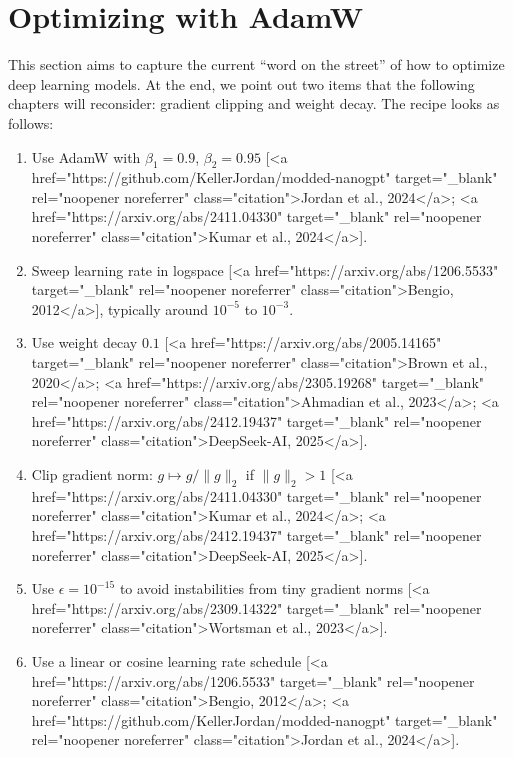\section{Optimizing with AdamW}

This section aims to capture the current “word on the street” of how to optimize deep learning models. At the end, we point out two items that the following chapters will reconsider: gradient clipping and weight decay. The recipe looks as follows:

\begin{enumerate}
    \item Use AdamW with $\beta_1 = 0.9$, $\beta_2 = 0.95$ [<a href="https://github.com/KellerJordan/modded-nanogpt" target="_blank" rel="noopener noreferrer" class="citation">Jordan et al., 2024</a>; <a href="https://arxiv.org/abs/2411.04330" target="_blank" rel="noopener noreferrer" class="citation">Kumar et al., 2024</a>].
    \item Sweep learning rate in logspace [<a href="https://arxiv.org/abs/1206.5533" target="_blank" rel="noopener noreferrer" class="citation">Bengio, 2012</a>], typically around $10^{-5}$ to $10^{-3}$.
    \item Use weight decay $0.1$ [<a href="https://arxiv.org/abs/2005.14165" target="_blank" rel="noopener noreferrer" class="citation">Brown et al., 2020</a>; <a href="https://arxiv.org/abs/2305.19268" target="_blank" rel="noopener noreferrer" class="citation">Ahmadian et al., 2023</a>; <a href="https://arxiv.org/abs/2412.19437" target="_blank" rel="noopener noreferrer" class="citation">DeepSeek-AI, 2025</a>].
    \item Clip gradient norm: $g \mapsto g / \|g\|_2$ if $\|g\|_2 > 1$ [<a href="https://arxiv.org/abs/2411.04330" target="_blank" rel="noopener noreferrer" class="citation">Kumar et al., 2024</a>; <a href="https://arxiv.org/abs/2412.19437" target="_blank" rel="noopener noreferrer" class="citation">DeepSeek-AI, 2025</a>].
    \item Use $\epsilon = 10^{-15}$ to avoid instabilities from tiny gradient norms [<a href="https://arxiv.org/abs/2309.14322" target="_blank" rel="noopener noreferrer" class="citation">Wortsman et al., 2023</a>].
    \item Use a linear or cosine learning rate schedule [<a href="https://arxiv.org/abs/1206.5533" target="_blank" rel="noopener noreferrer" class="citation">Bengio, 2012</a>; <a href="https://github.com/KellerJordan/modded-nanogpt" target="_blank" rel="noopener noreferrer" class="citation">Jordan et al., 2024</a>].
\end{enumerate}




